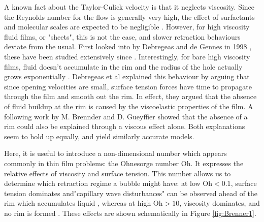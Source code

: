 \documentclass[a4paper,12pt]{article}
\numberwithin{equation}{section}
\numberwithin{figure}{section}
\numberwithin{table}{section}
\begin{document}
A known fact about the Taylor-Culick velocity is that it neglects viscosity. Since the Reynolds number for the flow is generally very high, the effect of surfactants and molecular scales are expected to be negligible \cite{Petit2015, Brenner1999}. However, for high viscosity fluid films, or "sheets", this is not the case, and slower retraction behaviours deviate from the usual. First looked into by Debregeas and de Gennes in 1998 \cite{Debregeas1998}, these have been studied extensively since \cite{Brenner1999, Savva2009}. Interestingly, for bare high viscosity films, fluid doesn't accumulate in the rim and the radius of the hole actually grows exponentially \cite{Debregeas1998}. Debregeas et al \cite{Debregeas1998} explained this behaviour by arguing that since opening velocities are small, surface tension forces have time to propagate through the film and smooth out the rim. In effect, they argued that the absence of fluid buildup at the rim is caused by the viscoelastic properties of the film. A following work by M. Brennder and D. Gueyffier \cite{Brenner1999} showed that the absence of a rim could also be explained through a viscous effect alone. Both explanations seem to hold up equally, and yield similarly accurate models.

Here, it is useful to introduce a non-dimensional number which appears commonly in thin film problems: the Ohnesorge number $\mathrm{Oh}$. It expresses the relative effects of viscosity and surface tension. This number allows us to determine which retraction regime a bubble might have: at low $\mathrm{Oh}<0.1$, surface tension dominates and"capillary wave disturbances" can be observed ahead of the rim which accumulates liquid , whereas at high $\mathrm{Oh}>10$, viscosity dominates, and no rim is formed \cite{Savva2009, Brenner1999}. These effects are shown schematically in Figure \ref{fig:Brenner1}.
\end{document}
